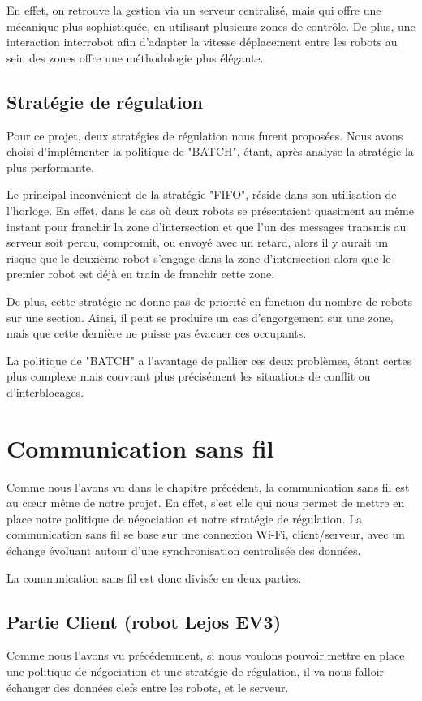 \documentclass[french,a4paper,12pt]{report}
\begin{document}
En effet, on retrouve la gestion via un serveur centralisé, mais qui offre une mécanique plus sophistiquée, en utilisant plusieurs zones de contrôle. De plus, une interaction interrobot afin d'adapter la vitesse déplacement entre les robots au sein des zones offre une méthodologie plus élégante.

\section{Stratégie de régulation}
Pour ce projet, deux stratégies de régulation nous furent proposées.
Nous avons choisi d'implémenter la politique de "BATCH", étant, après analyse la stratégie la plus performante.

Le principal inconvénient de la stratégie "FIFO", réside dans son utilisation de l'horloge.
En effet, dans le cas où deux robots se présentaient quasiment au même instant pour franchir la zone d'intersection et que l'un des messages transmis au serveur soit perdu, compromit, ou envoyé avec un retard, alors il y aurait un risque que le deuxième robot s'engage dans la zone d'intersection alors que le premier robot est déjà en train de franchir cette zone.

De plus, cette stratégie ne donne pas de priorité en fonction du nombre de robots sur une section. Ainsi, il peut se produire un cas d'engorgement sur une zone, mais que cette dernière ne puisse pas évacuer ces occupants.

La politique de "BATCH" a l'avantage de pallier ces deux problèmes, étant certes plus complexe mais couvrant plus précisément les situations de conflit ou d'interblocages.

\chapter{Communication sans fil}
Comme nous l'avons vu dans le chapitre précédent, la communication sans fil est au cœur même de notre projet. En effet, s'est elle qui nous permet de mettre en place notre politique de négociation et notre stratégie de régulation.
La communication sans fil se base sur une connexion Wi-Fi, client/serveur, avec un échange évoluant autour d'une synchronisation centralisée des données.

La communication sans fil est donc divisée en deux parties:

\section{Partie Client (robot Lejos EV3)}%
Comme nous l'avons vu précédemment, si nous voulons pouvoir mettre en place une politique de négociation et une stratégie de régulation, il va nous falloir échanger des données clefs entre les robots, et le serveur.
\end{document}
